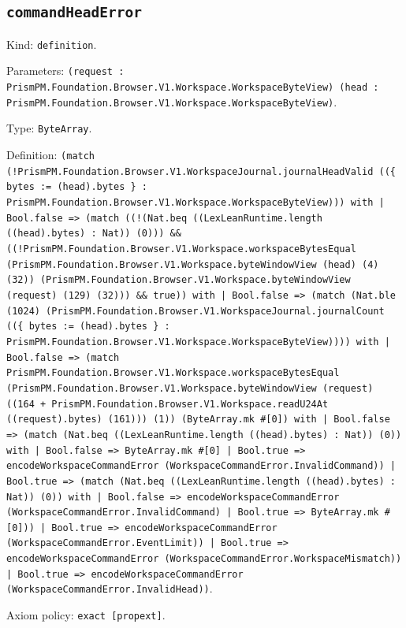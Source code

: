 \documentclass[11pt]{article}
\begin{document}
\subsection*{\texttt{commandHeadError}}
\noindent Kind: \texttt{definition}.\par
\noindent Parameters: \texttt{(request : PrismPM.Foundation.Browser.V1.Workspace.WorkspaceByteView) (head : PrismPM.Foundation.Browser.V1.Workspace.WorkspaceByteView)}.\par
\noindent Type: \texttt{ByteArray}.\par
\noindent Definition: \texttt{(match (!PrismPM.Foundation.Browser.V1.WorkspaceJournal.journalHeadValid ((\{ bytes := (head).bytes \} : PrismPM.Foundation.Browser.V1.Workspace.WorkspaceByteView))) with | Bool.false => (match ((!(Nat.beq ((LexLeanRuntime.length ((head).bytes) : Nat)) (0))) \&\& ((!PrismPM.Foundation.Browser.V1.Workspace.workspaceBytesEqual (PrismPM.Foundation.Browser.V1.Workspace.byteWindowView (head) (4) (32)) (PrismPM.Foundation.Browser.V1.Workspace.byteWindowView (request) (129) (32))) \&\& true)) with | Bool.false => (match (Nat.ble (1024) (PrismPM.Foundation.Browser.V1.WorkspaceJournal.journalCount ((\{ bytes := (head).bytes \} : PrismPM.Foundation.Browser.V1.Workspace.WorkspaceByteView)))) with | Bool.false => (match PrismPM.Foundation.Browser.V1.Workspace.workspaceBytesEqual (PrismPM.Foundation.Browser.V1.Workspace.byteWindowView (request) ((164 + PrismPM.Foundation.Browser.V1.Workspace.readU24At ((request).bytes) (161))) (1)) (ByteArray.mk \#[0]) with | Bool.false => (match (Nat.beq ((LexLeanRuntime.length ((head).bytes) : Nat)) (0)) with | Bool.false => ByteArray.mk \#[0] | Bool.true => encodeWorkspaceCommandError (WorkspaceCommandError.InvalidCommand)) | Bool.true => (match (Nat.beq ((LexLeanRuntime.length ((head).bytes) : Nat)) (0)) with | Bool.false => encodeWorkspaceCommandError (WorkspaceCommandError.InvalidCommand) | Bool.true => ByteArray.mk \#[0])) | Bool.true => encodeWorkspaceCommandError (WorkspaceCommandError.EventLimit)) | Bool.true => encodeWorkspaceCommandError (WorkspaceCommandError.WorkspaceMismatch)) | Bool.true => encodeWorkspaceCommandError (WorkspaceCommandError.InvalidHead))}.\par
\noindent Axiom policy: \texttt{exact [propext]}.\par
\end{document}
